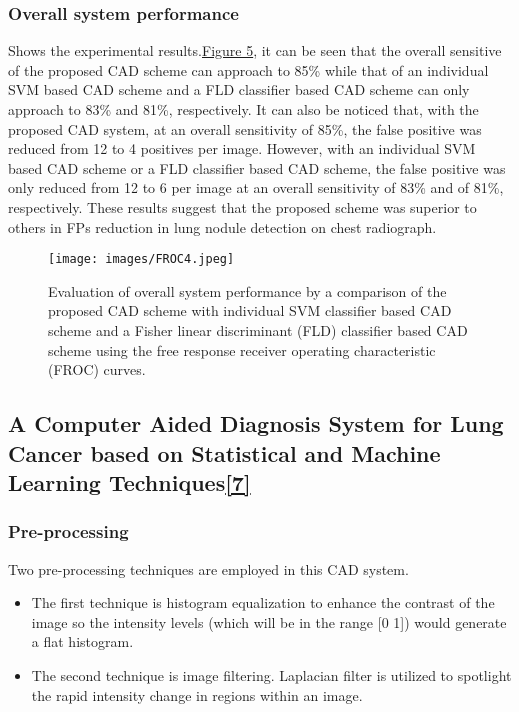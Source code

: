 \documentclass[hidelinks,12pt]{article}
\begin{document}
\subsubsection{Overall system performance}
Shows the experimental results.\hyperref[fig:4]{Figure 5}, it can be seen that the overall sensitive of the proposed CAD scheme can approach to 85\% while that of an individual SVM based CAD scheme and a FLD classifier based CAD scheme can only approach to 83\% and 81\%, respectively. It can also be noticed that, with the proposed CAD system, at an overall sensitivity of 85\%, the false positive was reduced from 12 to 4 positives per image. However, with an individual SVM based CAD scheme or a FLD classifier based CAD scheme, the false positive was only reduced from 12 to 6 per image at an overall sensitivity of 83\% and of 81\%, respectively. These results suggest that the proposed scheme was superior to others in FPs reduction in lung nodule detection on chest radiograph.

\newpage

\begin{figure}[h]
      \texttt{[image: images/FROC4.jpeg]}
      \centering
      \label{fig:4}
      \caption{Evaluation of overall system performance by a comparison of the proposed CAD scheme with individual SVM classifier based CAD scheme and a Fisher linear discriminant (FLD) classifier based CAD scheme using the free response receiver operating characteristic (FROC) curves.}
\end{figure}  

\newpage
\subsection{A Computer Aided Diagnosis System for Lung Cancer based on Statistical and Machine Learning Techniques\hyperref[7]{[7]}}

\subsubsection{Pre-processing}
Two pre-processing techniques are employed in this CAD system.
\begin{itemize}
\item The first technique is histogram equalization to enhance the contrast of the image so the intensity levels (which will be in the range [0 1]) would generate a flat histogram.
\item The second technique is image filtering. Laplacian filter is utilized to spotlight the rapid intensity change in regions within an image.
\end{itemize}
\end{document}

